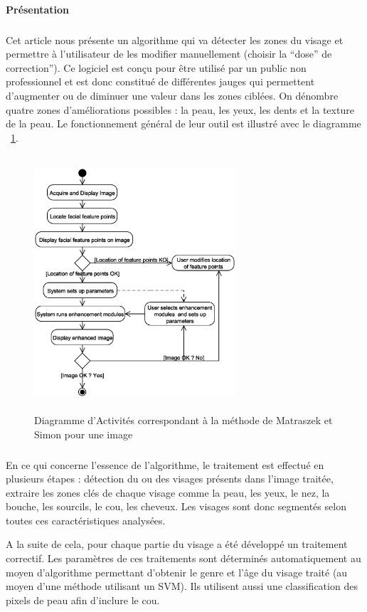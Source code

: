 \documentclass[11pt, french,screen]{report-rd-info}
\begin{document}
\paragraph{Présentation}
\subparagraph{}
Cet article nous présente un algorithme qui va détecter les zones du visage et permettre à l'utilisateur de les modifier manuellement (choisir la “dose” de correction”). Ce logiciel est conçu pour être utilisé par un public non professionnel et est donc constitué de différentes jauges qui permettent d'augmenter ou de diminuer une valeur dans les zones ciblées. On dénombre quatre zones d'améliorations possibles : la peau, les yeux, les dents et la texture de la peau. Le fonctionnement général de leur outil est illustré avec le diagramme ~\ref{diag:diagrammebatch}.
\begin{figure}
\centering
\includegraphics[height=9.5cm,width=7.5cm]{Images/ActivityBatch.eps}
\caption{Diagramme d'Activités correspondant à la méthode de Matraszek et Simon\cite{Matraszek2004} pour une image}
\label{diag:diagrammebatch}
\end{figure}

\subparagraph{}
En ce qui concerne l’essence de l’algorithme, le traitement est effectué en plusieurs étapes : détection du ou des visages présents dans l’image traitée, extraire les zones clés de chaque visage comme la peau, les yeux, le nez, la bouche, les sourcils, le cou, les cheveux. Les visages sont donc segmentés selon toutes ces caractéristiques analysées. 

A la suite de cela, pour chaque partie du visage a été développé un traitement correctif. Les paramètres de ces traitements sont déterminés automatiquement au moyen d’algorithme permettant d’obtenir le genre et l’âge du visage traité (au moyen d’une méthode utilisant un SVM). Ils utilisent aussi une classification des pixels de peau afin d’inclure le cou.
\end{document}
